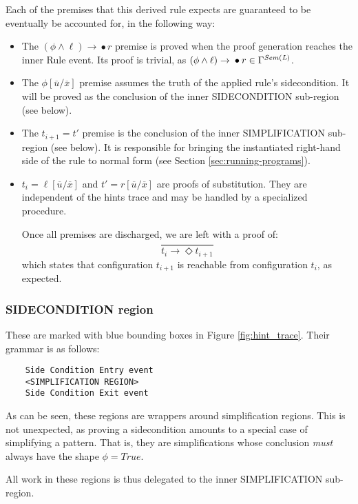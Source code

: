\documentclass{article}
\theoremstyle{plain}
\theoremstyle{definition}
\begin{document}
Each of the premises that this derived rule expects are guaranteed to be eventually be accounted for, in the following way:
\begin{itemize}
    \item The $(\phi \land \ell) \rightarrow {}\bullet{} r$ premise is proved when the proof generation reaches the inner Rule event. Its proof is trivial, as $(\phi \land \ell) \rightarrow {}\bullet{} r \in \Gamma^{\it Sem(L)}$.
    \item The $\phi[\overline{u}/\overline{x}]$ premise assumes the truth of the applied rule's sidecondition. It will be proved as the conclusion of the inner SIDECONDITION sub-region (see below).
    \item The $t_{i+1} = t'$ premise is the conclusion of the inner SIMPLIFICATION sub-region (see below). It is responsible for bringing the instantiated right-hand side of the rule to normal form (see Section \ref{sec:running-programs}).
    \item $t_i = \ell[\overline{u}/\overline{x}]$ and $ t' = r[\overline{u}/\overline{x}]$ are proofs of substitution. They are independent of the hints trace and may be handled by a specialized procedure.

Once all premises are discharged, we are left with a proof of:
\[
\dfrac{}{t_i \rightarrow{} \Diamond t_{i+1}}
\]
which states that configuration $t_{i+1}$ is reachable from configuration $t_i$, as expected.

\end{itemize}

\subsubsection*{SIDECONDITION region}
These are marked with blue bounding boxes in Figure \ref{fig:hint_trace}. Their grammar is as follows:

\begin{verbatim}
    Side Condition Entry event
    <SIMPLIFICATION REGION>
    Side Condition Exit event
\end{verbatim}

As can be seen, these regions are wrappers around simplification regions. This is not unexpected, as proving a sidecondition amounts to a special case of simplifying a pattern. That is, they are simplifications whose conclusion \textit{must} always have the shape $\phi = True$.

All work in these regions is thus delegated to the inner SIMPLIFICATION sub-region.
\end{document}
